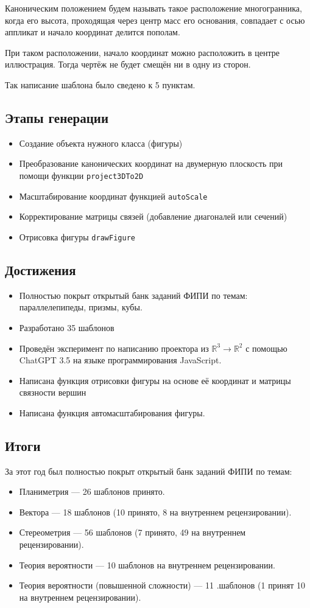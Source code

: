 \documentclass[a4paper, 12pt]{extarticle}
\begin{document}
Каноническим положением будем называть такое расположение многогранника, когда его высота, проходящая через центр масс его основания, совпадает с осью аппликат и начало координат делится пополам.

При таком расположении, начало координат можно расположить в центре иллюстрация. Тогда чертёж не будет смещён ни в одну из сторон.

Так написание шаблона было сведено к 5 пунктам.

\subsection*{Этапы генерации}
\begin{itemize}
	\item Создание объекта нужного класса (фигуры)
	\item Преобразование канонических координат на двумерную плоскость при помощи функции \texttt{project3DTo2D}
	\item Масштабирование координат функцией \texttt{autoScale}
	\item Корректирование матрицы связей (добавление диагоналей или сечений)
	\item Отрисовка фигуры \texttt{drawFigure}
\end{itemize}

\subsection*{Достижения}
\begin{itemize}
	\item Полностью покрыт открытый банк заданий ФИПИ по темам: параллелепипеды, призмы, кубы.
	\item Разработано 35 шаблонов
	\item Проведён эксперимент по написанию проектора из $\mathbb{R}^3 \to \mathbb{R}^2$ с помощью ChatGPT 3.5 на языке программирования JavaScript.
	\item Написана функция отрисовки фигуры на основе её координат и матрицы связности вершин
	\item Написана функция автомасштабирования фигуры.
\end{itemize}

\subsection*{Итоги}
За этот год был полностью покрыт открытый банк заданий ФИПИ по темам:
\begin{itemize}
	\item Планиметрия — 26 шаблонов принято.
	\item Вектора — 18 шаблонов (10 принято, 8 на внутреннем рецензировании).
	\item Стереометрия — 56 шаблонов (7 принято, 49 на внутреннем рецензировании).
	\item Теория вероятности — 10 шаблонов на внутреннем рецензировании.
	\item Теория вероятности (повышенной сложности) — 11 .шаблонов (1 принят 10 на внутреннем рецензировании).
\end{itemize}
\end{document}

